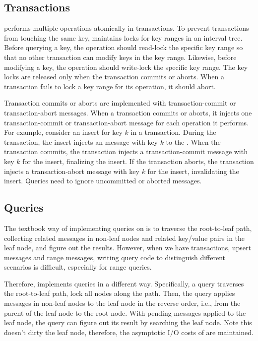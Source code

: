 \subsection{Transactions}
\label{sec:bg:impl:txn}

\Fti performs multiple operations atomically in transactions.
To prevent transactions from touching the same key, \fti maintains locks for key
ranges in an interval tree.
Before querying a key, the operation should read-lock the specific key range so
that no other transaction can modify keys in the key range.
Likewise, before modifying a key, the operation should write-lock the specific
key range.
The key locks are released only when the transaction commits or aborts.
When a transaction fails to lock a key range for its operation, it should
abort.

Transaction commits or aborts are implemented with transaction-commit or
transaction-abort messages.
When a transaction commits or aborts, it injects one transaction-commit or
transaction-abort message for each operation it performs.
For example, consider an insert for key $k$ in a transaction.
During the transaction, the insert injects an \putm message with key $k$
to the \bet.
When the transaction commits, the transaction injects a transaction-commit
message with key $k$ for the insert, finalizing the insert.
If the transaction aborts, the transaction injects a transaction-abort message
with key $k$ for the insert, invalidating the insert.
Queries need to ignore uncommitted or aborted messages.

\subsection{Queries}
\label{sec:bg:impl:query}

The textbook way of implementing queries on \bets is to traverse the
root-to-leaf path, collecting related messages in non-leaf nodes and related
key/value pairs in the leaf node,
and figure out the results.
However, when we have transactions, upsert messages and range messages,
writing query code to distinguish different scenarios is difficult,
especially for range queries.

Therefore, \fti implements queries in a different way.
Specifically, a query traverses the root-to-leaf path, lock all nodes along the
path.
Then, the query applies messages in non-leaf nodes to the leaf node in the
reverse order, i.e., from the parent of the leaf node to the root node.
With pending messages applied to the leaf node, the query can figure out its
result by searching the leaf node.
Note this doesn't dirty the leaf node, therefore,
the asymptotic I/O costs of \bets are maintained.

